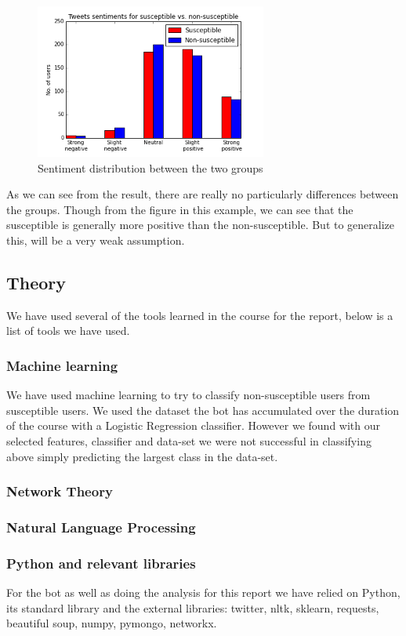 \documentclass[10pt]{IEEEtran}
\begin{document}
\begin{figure}[H]
  \centering
  \includegraphics[width=3.0in]{sentiment_barplot}
  \caption{Sentiment distribution between the two groups}
  \label{fig:sentiment_barplot}
\end{figure}


As we can see from the result, there are really no particularly differences between the groups. Though from the figure in this example, we can see that the susceptible is generally more positive than the non-susceptible. But to generalize this, will be a very weak assumption. 

\subsection{Theory}
We have used several of the tools learned in the course for the report, below is a list of tools we have used.\\
\subsubsection{Machine learning}
We have used machine learning to try to classify non-susceptible users from susceptible users. We used the dataset the bot has accumulated over the duration of the course with a Logistic Regression classifier. However we found with our selected features, classifier and data-set we were not successful in classifying above simply predicting the largest class in the data-set.
\subsubsection{Network Theory}
\subsubsection{Natural Language Processing}
\subsubsection{Python and relevant libraries}
For the bot as well as doing the analysis for this report we have relied on Python, its standard library and the external libraries: twitter, nltk, sklearn, requests, beautiful soup, numpy, pymongo, networkx.
\end{document}
